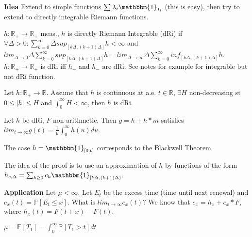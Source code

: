 \textbf{Idea} Extend to simple functions $\sum_{}^{} \lambda_i \mathbbm{1}_{I_i}$ (this is easy), then try to extend to directly integrable Riemann functions.

\begin{defn}
	$h: \mathbb{R}_+ \to \mathbb{R}_+$ meas., $h$ is directly Riemann Integrable (dRi) if $\forall \Delta >0: \sum_{k=0}^{\infty}\Delta sup_{[k \Delta, (k+1)\Delta]} h < \infty$ and $lim_{\Delta \to 0} \Delta \sum_{k=0}^{\infty} sup_{[k \Delta,(k+1)\Delta] } h = lim _{\Delta \to \infty} \Delta \sum_{k=0}^{\infty} inf_{[k \Delta, (k+1)\Delta]}h$. $h: \mathbb{R}_+ \to \mathbb{R}_+$ is dRi iff $h_+$ and $h_-$ are dRi. See notes for example for integrable but not dRi function.
\end{defn}

\begin{prop}[]
	Let $h: \mathbb{R}_+ \to \mathbb{R}$. Assume that $h$ is continuous at a.e. $t \in \mathbb{R}$, $\exists H$ non-decreasing st $0 \leq |h| \leq H$ and $\int_{0}^{\infty} H < \infty$, then $h$ is dRi. 
\end{prop}

\begin{theorem}
	Let $h$ be dRi, $F$ non-arithmetic. Then $g=h+h*m$ satisfies $lim_{t \to \infty}g(t)= \frac{1}{\mu } \int_{0}^{\infty} h(u) du$.
\end{theorem}

\begin{rmk}[]
	The case $h= \mathbbm{1}_{[0,b]}$ corresponds to the Blackwell Theorem. 
\end{rmk}

The idea of the proof is to use an approximation of $h$ by functions of the form $h_{c,\Delta}=\sum_{k\geq 0}^{} c_k \mathbbm{1} _{[k\Delta, (k+1)\Delta)}$.

\textbf{Application} Let $\mu < \infty$. Let $E_t$ be the excess time (time until next renewal) and $e_x(t) = \mathbb{P}_{} \left[ E_t \leq x \right] $. What is $lim_{t \to \infty} e_x(t)$? We know that $e_x = h_x + e_x*F$, where $h_x(t) = F(t+x)-F(t)$.

\begin{rmk}[]
	$\mu = \mathbb{E}_{} \left[ T_1 \right] = \int_{0}^{\infty} \mathbb{P}_{} \left[ T_1 > t \right] dt$
\end{rmk}

